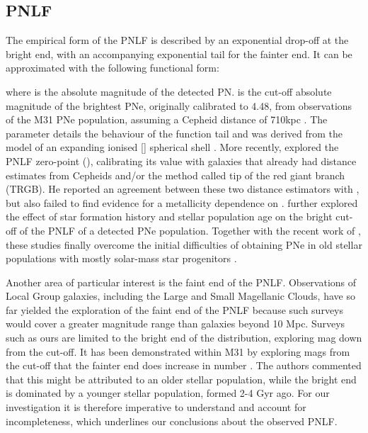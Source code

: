 \documentclass{aa}
\begin{document}
\subsection{PNLF}
The empirical form of the PNLF \citep[as introduced by][Eq.~\ref{eq:PNLF}]{ciardullo_planetary_1989} is described by an exponential drop-off at the bright end, with an accompanying exponential tail for the fainter end. It can be approximated with the following functional form:

where  is the absolute magnitude of the detected PN.  is the cut-off absolute magnitude of the brightest PNe, originally calibrated to 4.48, from observations of the M31 PNe population, assuming a Cepheid distance of 710kpc \citep{ciardullo_planetary_1989}. The  parameter details the behaviour of the function tail and was derived from the model of an expanding ionised [] spherical shell \citep[ = 0.307;][]{henize_dimensions_1963}. 
More recently, \citet{ciardullo_planetary_2012} explored the PNLF zero-point (), calibrating its value with galaxies that already had distance estimates from Cepheids and/or the method called  tip of the red giant branch (TRGB). He reported an agreement between these two distance estimators with , but also failed to find evidence for a metallicity dependence on . \citet{gesicki_mysterious_2018} further explored the effect of star formation history and stellar population age on the bright cut-off of the PNLF of a detected PNe population. Together with the recent work of \citet{valenzuela_revised_2019}, these studies finally overcome the initial difficulties of obtaining  PNe in old stellar populations with mostly solar-mass star progenitors \citep[e.g.][]{marigo_evolution_2004}.


Another area of particular interest is the faint end of the PNLF. Observations of Local Group galaxies, including the Large and Small Magellanic Clouds, have so far yielded the exploration of the faint end of the PNLF because such surveys would cover a greater magnitude range than galaxies beyond 10 Mpc. Surveys such as ours are limited to the bright end of the distribution, exploring  mag down from the cut-off. It has been demonstrated within M31 by exploring  mags from the cut-off that the fainter end does increase in number \citep{bhattacharya_survey_2019-1}. The authors commented that this might be attributed to an older stellar population, while the bright end is dominated by a younger stellar population, formed 2-4 Gyr ago. For our investigation it is therefore imperative to understand and account for incompleteness, which underlines our conclusions about the observed PNLF.
\end{document}

